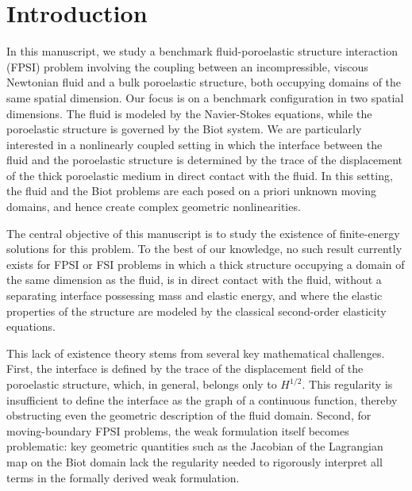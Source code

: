 \documentclass[11pt]{article}
\theoremstyle{definition}
\begin{document}
\begin{abstract}
An accompanying work will prove {\emph{weak-classical consistency}}, showing that in the limit $\delta \to 0$, the regularized weak solutions recover classical solutions to the non-regularized problem when such classical solutions exist.

\end{abstract}

\section{Introduction}

In this manuscript, we study a benchmark fluid-poroelastic structure interaction (FPSI) problem involving the coupling between an incompressible, viscous Newtonian fluid and a bulk poroelastic structure, both occupying domains of the same spatial dimension. Our focus is on a benchmark configuration in two spatial dimensions. The fluid is modeled by the Navier-Stokes equations, while the poroelastic structure is governed by the Biot system.
%
We are particularly interested in a nonlinearly coupled setting in which the interface between the fluid and the poroelastic structure is determined by the trace of the displacement of the thick poroelastic medium in direct contact with the fluid.
In this setting, the fluid and the Biot problems are each posed on a priori unknown moving domains, and hence create complex geometric nonlinearities.

The central objective of this manuscript is to study the existence of finite-energy solutions for this problem. To the best of our knowledge, no such result currently exists for FPSI or FSI problems in which a thick structure occupying a domain of the same dimension as the fluid, is in direct contact with the fluid, without a separating interface possessing mass and elastic energy, and where the elastic properties of the structure are modeled by the classical second-order elasticity equations.

%
This lack of existence theory stems from several key mathematical challenges. First, the interface is defined by the trace of the displacement field of the poroelastic structure, which, in general, belongs only to $H^{1/2}$. This regularity is insufficient to define the interface as the graph of a continuous function, thereby obstructing even the geometric description of the fluid domain. Second, for moving-boundary FPSI problems, the weak formulation itself becomes problematic: key geometric quantities such as the Jacobian of the Lagrangian map on the Biot domain lack the regularity needed to rigorously interpret all terms in the formally derived weak formulation.
\end{document}
